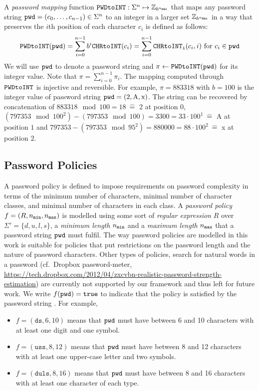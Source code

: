 A \emph{password mapping} function $\texttt{PWDtoINT}:\Sigma^n\mapsto\mathbb{Z}_{b^{{n_\mathtt{max}}}}$ that maps any password string $\mathtt{pwd}=(c_{0},\dots,c_{n-1})\in\Sigma^n$ to an integer in a larger set $\mathbb{Z}_{b^{{n_\mathtt{max}}}}$ in a way that preserves the $i$th position of each character $c_i$ is defined as follows:
\[
\texttt{PWDtoINT}(\mathtt{pwd}) = \sum_{i=0}^{n-1}b^{i} \texttt{CHRtoINT}(c_{i}) = \sum_{i=0}^{n-1}\texttt{CHRtoINT}_\texttt{i}(c_i, i) \textrm{ for } c_i\in\mathtt{pwd}
\]
We will use $\mathtt{pwd}$ to denote a password string and $\pi \gets \texttt{PWDtoINT}(\mathtt{pwd})$ for its integer value. Note that $\pi = \sum_{i=0}^{n-1}\pi_i$. %
The mapping computed through $\texttt{PWDtoINT}$ is injective and reversible. For example, $\pi = 883318$ with $b=100$ is the integer value of password string $\mathtt{pwd} = (\textrm{2},\textrm{A},\textrm{x})$. The string can be recovered by concatenation of $883318\mod 100=18~ \widehat{=}$ 2 at position 0, $(797353\mod 100^2)-(797353\mod 100)=3300=33\cdot 100^1~ \widehat{=}$ A at position $1$ and $797353-(797353\mod95^2)=880000=88\cdot 100^2~ \widehat{=}$ x at position $2$.



\subsection{Password Policies}\label{sec:policies}
A password policy is defined to impose requirements on password complexity in terms of the minimum number of characters, minimal number of character classes, and minimal number of characters in each class.
A \emph{password policy} $f=(R,{n_\mathtt{min}},{n_\mathtt{max}})$ is modelled using some sort of \emph{regular expression} $R$ over $\Sigma'=\{d, u, l, s\}$, a \emph{minimum length} ${n_\mathtt{min}}$ and a \emph{maximum length} ${n_\mathtt{max}}$ that a password string $\mathtt{pwd}$ must fulfil.
The way password policies are modelled in this work is suitable for policies that put restrictions on the password length and the nature of password characters. Other types of policies, \eg search for natural words in a password (cf.~Dropbox password-meter, \url{https://tech.dropbox.com/2012/04/zxcvbn-realistic-password-strength-estimation}) are currently not supported by our framework and thus left for future work.
We write $f(\mathtt{pwd})=\mathtt{true}$ to indicate that the policy is satisfied by the password string \pwd.
For example, %
\begin{itemize}
	\item $f=(\mathtt{ds}, 6, 10)$ means that $\mathtt{pwd}$ must have between 6 and 10 characters with at least one digit and one symbol.
	\item $f=(\mathtt{uss}, 8, 12)$ means that $\mathtt{pwd}$ must have between 8 and 12 characters with at least one upper-case letter and two symbols.
	\item $f=(\mathtt{duls}, 8, 16)$ means that $\mathtt{pwd}$ must have between 8 and 16 characters with at least one character of each type.
\end{itemize}

